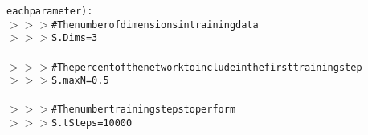 {{\begin{tabbing}
{\texttt{each\hspace{6pt}parameter):}}\\
{\texttt{$>$$>$$>$\hspace{6pt}\#The\hspace{6pt}number\hspace{6pt}of\hspace{6pt}dimensions\hspace{6pt}in\hspace{6pt}training\hspace{6pt}data}}\\
{\texttt{$>$$>$$>$\hspace{6pt}S.Dims\hspace{6pt}=\hspace{6pt}3}}\\
\\
{\texttt{$>$$>$$>$\hspace{6pt}\#The\hspace{6pt}percent\hspace{6pt}of\hspace{6pt}the\hspace{6pt}network\hspace{6pt}to\hspace{6pt}include\hspace{6pt}in\hspace{6pt}the\hspace{6pt}first\hspace{6pt}training\hspace{6pt}step}}\\
{\texttt{$>$$>$$>$\hspace{6pt}S.maxN\hspace{6pt}=\hspace{6pt}0.5}}\\
\\
{\texttt{$>$$>$$>$\hspace{6pt}\#The\hspace{6pt}number\hspace{6pt}training\hspace{6pt}steps\hspace{6pt}to\hspace{6pt}perform}}\\
{\texttt{$>$$>$$>$\hspace{6pt}S.tSteps\hspace{6pt}=\hspace{6pt}10000\hspace{6pt}}}\\
\\

\end{tabbing}}}
